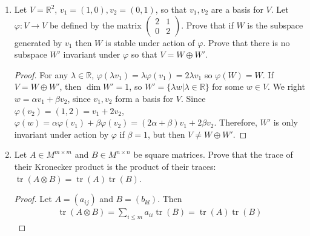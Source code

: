 \documentclass{report}
\newcommand{\R}{\mathbb{R}}
\DeclareMathOperator{\tr}{tr}
\begin{document}
\begin{enumerate}
	\item Let $V=\R^2$, $v_1=(1,0),v_2=(0,1)$, so that $v_1,v_2$ are a basis for $V$. Let $\varphi:V\to V$ be defined by the matrix $\begin{pmatrix}2&1\\0&2\end{pmatrix}$.
		Prove that if $W$ is the subspace generated by $v_1$ then $W$ is stable under action of $\varphi$.
		Prove that there is no subspace $W'$ invariant under $\varphi$ so that $V=W\oplus W'$.
		\begin{proof}
			For any $\lambda\in\R$, $\varphi(\lambda v_1)=\lambda\varphi(v_1)=2\lambda v_1$ so $\varphi(W)=W$.
			If $V=W\oplus W'$, then $\dim W'=1$, so $W'=\{\lambda w|\lambda\in\R\}$ for some $w\in V$. We right $w=\alpha v_1+\beta v_2$, since $v_1,v_2$ form a basis for $V$.
			Since $\varphi(v_2)=(1,2)=v_1+2v_2$, $\varphi(w)=\alpha\varphi(v_1)+\beta\varphi(v_2)=(2\alpha+\beta)v_1+2\beta v_2$.
			Therefore, $W'$ is only invariant under action by $\varphi$ if $\beta=1$, but then $V\neq W\oplus W'$.
		\end{proof}
		\setcounter{enumi}{37}
	\item Let $A\in M^{m\times m}$ and $B\in M^{n\times n}$ be square matrices. Prove that the trace of their Kronecker product is the product of their traces: $\tr(A\otimes B)=\tr(A)\tr(B)$.
		\begin{proof}
			Let $A=(a_{ij})$ and $B=(b_{kl})$. Then
			\begin{align*}
				\tr(A\otimes B) = \sum_{i\leq m} a_{ii} \tr(B) = \tr(A)\tr(B) 
			\end{align*}
		\end{proof}
\end{enumerate}
\end{document}
